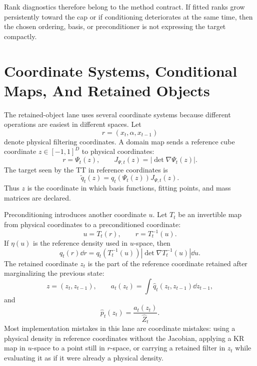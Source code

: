 Rank diagnostics therefore belong to the method contract.  If fitted ranks grow
persistently toward the cap or if conditioning deteriorates at the same time,
then the chosen ordering, basis, or preconditioner is not expressing the target
compactly.

\section{Coordinate Systems, Conditional Maps, And Retained Objects}
\label{sec:bf-hd-ttkr-coordinates}

The retained-object lane uses several coordinate systems because different
operations are easiest in different spaces.  Let
\begin{equation}
  r=(x_t,\alpha,x_{t-1})
  \label{eq:bf-hd-coord-physical}
\end{equation}
denote physical filtering coordinates.  A domain map sends a reference cube
coordinate \(z\in[-1,1]^D\) to physical coordinates:
\begin{equation}
  r=\Psi_t(z),
  \qquad
  J_{\Psi,t}(z)=\left|\det\nabla\Psi_t(z)\right|.
  \label{eq:bf-hd-coord-domain}
\end{equation}
The target seen by the TT in reference coordinates is
\begin{equation}
  \widetilde q_t(z)=q_t(\Psi_t(z))J_{\Psi,t}(z).
  \label{eq:bf-hd-coord-reference-density}
\end{equation}
Thus \(z\) is the coordinate in which basis functions, fitting points, and mass
matrices are declared.

Preconditioning introduces another coordinate \(u\).  Let \(T_t\) be an
invertible map from physical coordinates to a preconditioned coordinate:
\begin{equation}
  u=T_t(r),
  \qquad
  r=T_t^{-1}(u).
  \label{eq:bf-hd-coord-preconditioner}
\end{equation}
If \(\eta(u)\) is the reference density used in \(u\)-space, then
\begin{equation}
  q_t(r)\dd r
  =
  q_t(T_t^{-1}(u))\left|\det\nabla T_t^{-1}(u)\right|\dd u.
  \label{eq:bf-hd-coord-density-u}
\end{equation}
The retained coordinate \(z_t\) is the part of the reference coordinate retained
after marginalizing the previous state:
\begin{equation}
  z=(z_t,z_{t-1}),
  \qquad
  a_t(z_t)=\int \widehat q_t(z_t,z_{t-1})\dd z_{t-1},
  \label{eq:bf-hd-coord-retained}
\end{equation}
and
\begin{equation}
  \widehat p_t(z_t)=\frac{a_t(z_t)}{\widehat Z_t}.
  \label{eq:bf-hd-coord-retained-filter}
\end{equation}
Most implementation mistakes in this lane are coordinate mistakes: using a
physical density in reference coordinates without the Jacobian, applying a KR map
in \(u\)-space to a point still in \(r\)-space, or carrying a retained filter in
\(z_t\) while evaluating it as if it were already a physical density.

